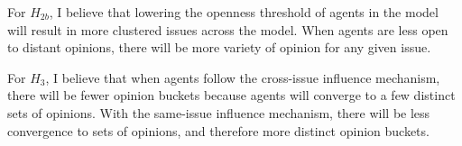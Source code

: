 For $H_{2b}$, I believe that lowering the openness threshold of agents in the
model will result in more clustered issues across the model. When agents are
less open to distant opinions, there will be more variety of opinion for any
given issue. 

For $H_{3}$, I believe that when agents follow the cross-issue influence mechanism, there will be fewer opinion buckets because agents will converge to a few distinct sets of opinions. With the same-issue influence mechanism, there will be less convergence to sets of opinions, and therefore more distinct opinion buckets. 